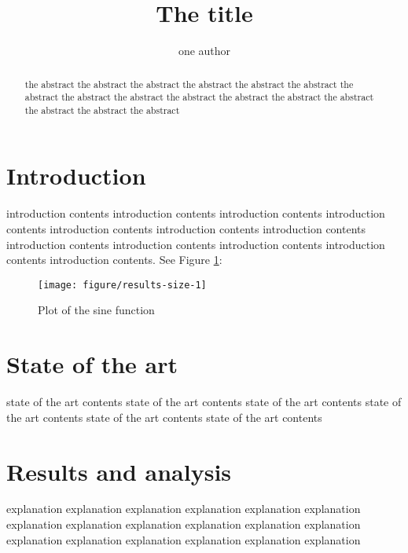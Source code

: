 \documentclass[runningheads,a4paper]{llncs}\usepackage[]{graphicx}\usepackage[]{color}
\newenvironment{knitrout}{}{} %
\begin{document}
\title{The title}

\author{one author}

\maketitle

\begin{abstract}
the abstract the abstract the abstract the abstract 
the abstract the abstract the abstract the abstract 
the abstract the abstract the abstract the abstract 
the abstract the abstract the abstract the abstract 
\end{abstract}

\section{Introduction}

introduction contents introduction contents introduction contents 
introduction contents introduction contents introduction contents 
introduction contents introduction contents introduction contents 
introduction contents introduction contents introduction contents.
See Figure \ref{fig:sine}:

\begin{figure}[h!tb]
  \centering
\begin{knitrout}
\color{fgcolor}
\texttt{[image: figure/results-size-1]} 

\end{knitrout}
\caption{Plot of the sine function}
\label{fig:sine}
\end{figure}


\section{State of the art}

state of the art contents state of the art contents 
state of the art contents state of the art contents 
state of the art contents state of the art contents \cite{unacita}

\section{Results and analysis}
\label{sec:res}

explanation explanation explanation explanation explanation explanation 
explanation explanation explanation explanation explanation explanation 
explanation explanation explanation explanation explanation explanation 
\end{document}
